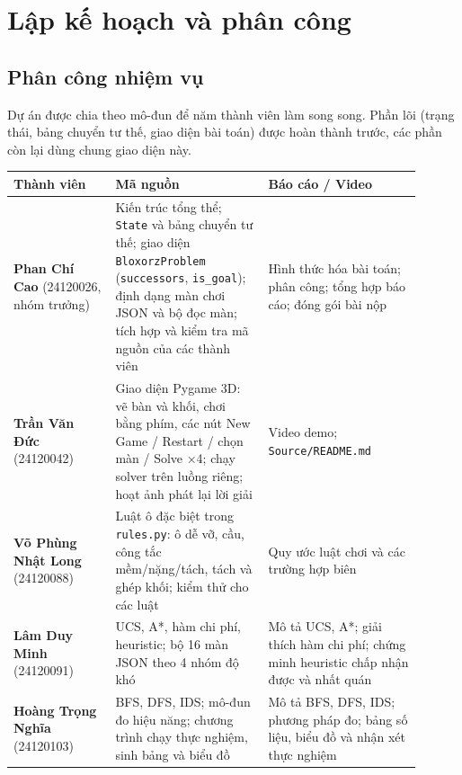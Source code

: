 \section{Lập kế hoạch và phân công}

\subsection{Phân công nhiệm vụ}

Dự án được chia theo mô-đun để năm thành viên làm song song. Phần lõi (trạng thái, bảng chuyển tư thế, giao diện bài toán) được hoàn thành trước, các phần còn lại dùng chung giao diện này.

{\renewcommand{\arraystretch}{1.25}
\begin{longtable}{|>{\raggedright\arraybackslash}p{0.221\linewidth}|>{\raggedright\arraybackslash}p{0.337\linewidth}|>{\raggedright\arraybackslash}p{0.337\linewidth}|}
\hline
\textbf{Thành viên} & \textbf{Mã nguồn} & \textbf{Báo cáo / Video} \\ \hline
\endhead
\hline
\endlastfoot
\textbf{Phan Chí Cao} (24120026, nhóm trưởng) & Kiến trúc tổng thể; \texttt{State} và bảng chuyển tư thế; giao diện \texttt{BloxorzProblem} (\texttt{successors}, \texttt{is\_\allowbreak{}goal}); định dạng màn chơi JSON và bộ đọc màn; tích hợp và kiểm tra mã nguồn của các thành viên & Hình thức hóa bài toán; phân công; tổng hợp báo cáo; đóng gói bài nộp \\ \hline
\textbf{Trần Văn Đức} (24120042) & Giao diện Pygame 3D: vẽ bàn và khối, chơi bằng phím, các nút New Game / Restart / chọn màn / Solve ×4; chạy solver trên luồng riêng; hoạt ảnh phát lại lời giải & Video demo; \texttt{Source/README.md} \\ \hline
\textbf{Võ Phùng Nhật Long} (24120088) & Luật ô đặc biệt trong \texttt{rules.py}: ô dễ vỡ, cầu, công tắc mềm/nặng/tách, tách và ghép khối; kiểm thử cho các luật & Quy ước luật chơi và các trường hợp biên \\ \hline
\textbf{Lâm Duy Minh} (24120091) & UCS, A*, hàm chi phí, heuristic; bộ 16 màn JSON theo 4 nhóm độ khó & Mô tả UCS, A*; giải thích hàm chi phí; chứng minh heuristic chấp nhận được và nhất quán \\ \hline
\textbf{Hoàng Trọng Nghĩa} (24120103) & BFS, DFS, IDS; mô-đun đo hiệu năng; chương trình chạy thực nghiệm, sinh bảng và biểu đồ & Mô tả BFS, DFS, IDS; phương pháp đo; bảng số liệu, biểu đồ và nhận xét thực nghiệm \\
\end{longtable}
}

